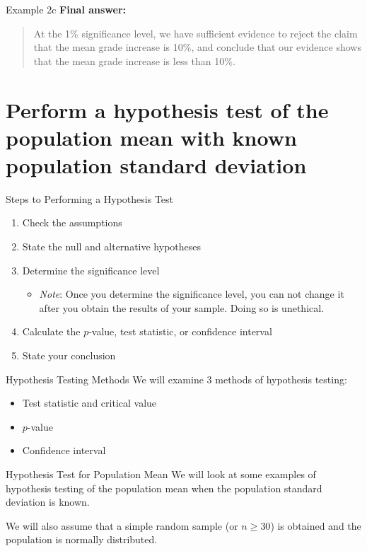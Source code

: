 \documentclass[t]{beamer}
\begin{document}
\begin{frame}{Example 2c}
\textbf{Final answer:}
\begin{quote}
At the 1\% significance level, we have sufficient evidence to reject the claim that the mean grade increase is 10\%, and conclude that our evidence shows that the mean grade increase is less than 10\%.
\end{quote}
\end{frame}

\section{Perform a hypothesis test of the population mean with known population standard deviation}

\begin{frame}{Steps to Performing a Hypothesis Test}
\begin{enumerate}
	\item Check the assumptions
	\item<2-> State the null and alternative hypotheses
	\item<3-> Determine the significance level
	\begin{itemize}
	\item<3-> \emph{Note}: Once you determine the significance level, you can not change it after you obtain the results of your sample. Doing so is unethical.
	\end{itemize}
	\item<4-> Calculate the $p$-value, test statistic, or confidence interval
	\item<5-> State your conclusion
\end{enumerate}
\end{frame}

\begin{frame}{Hypothesis Testing Methods}
We will examine 3 methods of hypothesis testing:	\newline\\
\begin{itemize}
	\item<2-> Test statistic and critical value
	\item<3-> $p$-value
	\item<4-> Confidence interval
\end{itemize}
\end{frame}

\begin{frame}{Hypothesis Test for Population Mean}
We will look at some examples of hypothesis testing of the population mean when the population standard deviation is known.	\newline\\	\pause

We will also assume that a simple random sample (or $n \geq 30$) is obtained and the population is normally distributed.
\end{frame}
\end{document}
